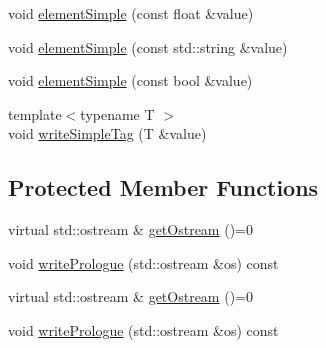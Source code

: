 \begin{DoxyCompactItemize}
\item 
void \mbox{\hyperlink{classXMLStructWriterAPI_1_1XMLArrayWriterBase_a7bb84df43c22d343c2006f1561ea3133}{element\+Simple}} (const float \&value)
\item 
void \mbox{\hyperlink{classXMLStructWriterAPI_1_1XMLArrayWriterBase_a1ec9aad9885d357f65462b5d4a7cf593}{element\+Simple}} (const std\+::string \&value)
\item 
void \mbox{\hyperlink{classXMLStructWriterAPI_1_1XMLArrayWriterBase_a69c66b868b51c45555aca1c5f857710e}{element\+Simple}} (const bool \&value)
\item 
{\footnotesize template$<$typename T $>$ }\\void \mbox{\hyperlink{classXMLStructWriterAPI_1_1XMLArrayWriterBase_a7c0092991561b5000ae55724cdc3d062}{write\+Simple\+Tag}} (T \&value)
\end{DoxyCompactItemize}
\subsection*{Protected Member Functions}
\begin{DoxyCompactItemize}
\item 
virtual std\+::ostream \& \mbox{\hyperlink{classXMLStructWriterAPI_1_1XMLArrayWriterBase_a0b692c4435105f1f67e0b6f0516135b6}{get\+Ostream}} ()=0
\item 
void \mbox{\hyperlink{classXMLStructWriterAPI_1_1XMLArrayWriterBase_a7345d02ca5658546b764ed621044c68d}{write\+Prologue}} (std\+::ostream \&os) const
\item 
virtual std\+::ostream \& \mbox{\hyperlink{classXMLStructWriterAPI_1_1XMLArrayWriterBase_a0b692c4435105f1f67e0b6f0516135b6}{get\+Ostream}} ()=0
\item 
void \mbox{\hyperlink{classXMLStructWriterAPI_1_1XMLArrayWriterBase_a7345d02ca5658546b764ed621044c68d}{write\+Prologue}} (std\+::ostream \&os) const
\end{DoxyCompactItemize}
